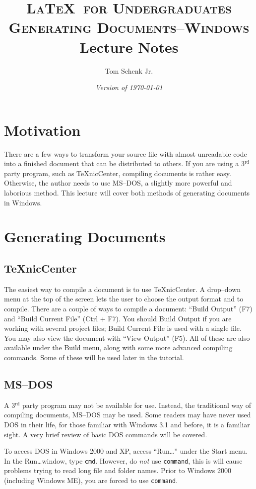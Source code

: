 \documentclass{article}
\title{\textsc{\LaTeX\ for Undergraduates\\
			Generating Documents--Windows} \\
			Lecture Notes}
\author{Tom Schenk Jr.}		%
\date{\textit{Version of \today}}
\begin{document}
\maketitle

\section{Motivation}

There are a few ways to transform your source file with almost unreadable code into a finished document that can be distributed to others. If you are using a 3$^{\textrm{rd}}$ party program, such as \TeX nicCenter, compiling documents is rather easy. Otherwise, the author needs to use MS--DOS, a slightly more powerful and laborious method. This lecture will cover both methods of generating documents in Windows.

\section{Generating Documents}

\subsection{\TeX nicCenter}

The easiest way to compile a document is to use \TeX nicCenter. A drop--down menu at the top of the screen lets the user to choose the output format and to compile. There are a couple of ways to compile a document: ``Build Output'' (F7) and ``Build Current File'' (Ctrl + F7). You should Build Output if you are working with several project files; Build Current File is used with a single file. You may also view the document with ``View Output'' (F5). All of these are also available under the Build menu, along with some more advanced compiling commands. Some of these will be used later in the tutorial.

\subsection{MS--DOS}

A 3$^{\textrm{rd}}$ party program may not be available for use. Instead, the traditional way of compiling documents, MS--DOS may be used. Some readers may have never used DOS in their life, for those familiar with Windows 3.1 and before, it is a familiar sight. A very brief review of basic DOS commands will be covered.

To access DOS in Windows 2000 and XP, access ``Run\ldots'' under the Start menu. In the Run\ldots window, type \texttt{cmd}. However, do \emph{not} use \texttt{command}, this is will cause problems trying to read long file and folder names. Prior to Windows 2000 (including Windows ME), you are forced to use \texttt{command}.
\end{document}
